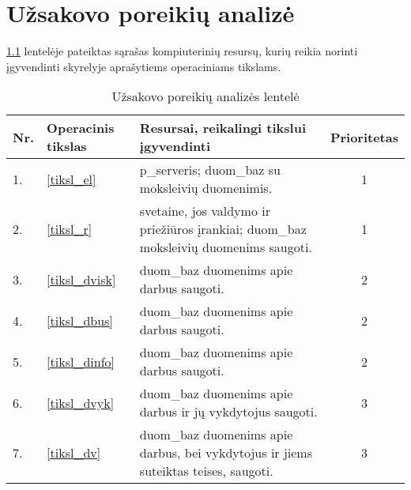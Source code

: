 \chapter{Užsakovo poreikių analizė}


\ref{tab:poreikiai} lentelėje pateiktas sąrašas kompiuterinių resursų, 
kurių reikia norinti įgyvendinti \emph{}
skyrelyje aprašytiems operaciniams tikslams.

\begin{table}
  \centering
  \begin{tabular}[]{| l | p{1.6cm} | p{5.8cm} | c |}
    \hline
    Nr. & Operacinis tikslas & Resursai, reikalingi tikslui įgyvendinti &
    Prioritetas \\
    \hline
    1. & \ref{tiksl_el} & 
      \Gls{p_serveris}; \gls{duom_baz} su moksleivių duomenimis. & 1 \\
    \hline
    2. & \ref{tiksl_r} & 
      \Gls{svetaine}, jos valdymo ir priežiūros įrankiai; 
      \gls{duom_baz} moksleivių duomenims saugoti. & 1 \\
    \hline
    3. & \ref{tiksl_dvisk} &
      \Gls{duom_baz} duomenims apie darbus saugoti. & 2 \\
    \hline
    4. & \ref{tiksl_dbus} &
      \Gls{duom_baz} duomenims apie darbus saugoti. & 2 \\
    \hline
    5. & \ref{tiksl_dinfo} &
      \Gls{duom_baz} duomenims apie darbus saugoti. & 2 \\
    \hline
    6. & \ref{tiksl_dvyk} &
      \Gls{duom_baz} duomenims apie darbus ir jų vykdytojus 
      saugoti. & 3 \\
    \hline
    7. & \ref{tiksl_dv} &
      \Gls{duom_baz} duomenims apie darbus, bei vykdytojus ir 
      jiems suteiktas teises, saugoti. & 3 \\
    \hline
  \end{tabular}
  \caption{Užsakovo poreikių analizės lentelė}
  \label{tab:poreikiai}
\end{table}
